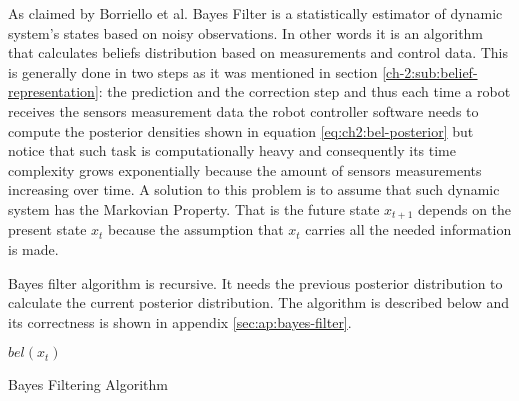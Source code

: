 As claimed by Borriello et al.\cite{Liao:bayesian-filters} Bayes Filter is a statistically estimator of dynamic system's states based on noisy observations. In other words it is an algorithm that calculates beliefs distribution based on measurements and control data\cite{Thrun:2005:PR:1121596}. This is generally done in two steps as it was mentioned in section \ref{ch-2:sub:belief-representation}: the prediction and the correction step and thus each time a robot receives the sensors measurement data the robot controller software needs to compute the posterior densities shown in equation \ref{eq:ch2:bel-posterior} but notice that such task is computationally heavy and consequently its time complexity grows exponentially because the amount of sensors measurements increasing over time. A solution to this problem is to assume that such dynamic system has the Markovian Property. That is the future state $x_{t+1}$ depends on the present state $x_t$ because the assumption that $x_t$ carries all the needed information is made.

Bayes filter algorithm is recursive. It needs the previous posterior distribution to calculate the current posterior distribution. The algorithm is described below and its correctness is shown in appendix \ref{sec:ap:bayes-filter}.

\IncMargin{1em}
\begin{algorithm}

\BlankLine

  \Return $bel(x_t)$
\caption{Bayes Filtering Algorithm\cite{Thrun:2005:PR:1121596}}

\label{ch-2:algo:bayes-filter}
\end{algorithm}\DecMargin{1em}


